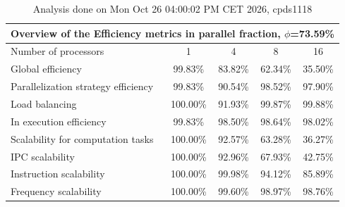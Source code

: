 \begin{table}[h]
\begin{center}
\begin{tabular}{|l|c|c|c|c|}
\hline
\multicolumn{5}{|c|}{Overview of the Efficiency metrics in parallel fraction, $\phi$=73.59\%} \\
\hline
\hline
Number of processors & 1 & 4 & 8 & 16 \\
\hline
\hline
Global efficiency                      &     99.83\% &     83.82\% &     62.34\% &     35.50\% \\
\hline
\hline
Parallelization strategy efficiency &     99.83\% &     90.54\% &     98.52\% &     97.90\% \\
\hline
Load balancing                   &    100.00\% &     91.93\% &     99.87\% &     99.88\% \\
In execution efficiency          &     99.83\% &     98.50\% &     98.64\% &     98.02\% \\
\hline
\hline
Scalability for computation tasks   &    100.00\% &     92.57\% &     63.28\% &     36.27\% \\
\hline
IPC scalability                  &    100.00\% &     92.96\% &     67.93\% &     42.75\% \\
Instruction scalability          &    100.00\% &     99.98\% &     94.12\% &     85.89\% \\
Frequency scalability            &    100.00\% &     99.60\% &     98.97\% &     98.76\% \\
\hline
\end{tabular}
\end{center}
\caption{ Analysis done on Mon Oct 26 04:00:02 PM CET 2026, cpds1118}
\end{table}
